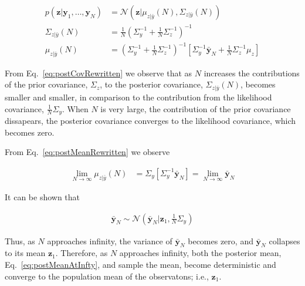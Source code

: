 \documentclass[12pt]{article}
\begin{document}
\begin{align}
    p(\mathbf{z}|\mathbf{y}_1,\ldots,\mathbf{y}_N)&=\mathcal{N}(\mathbf{z}|\mu_{z|\bar{y}}(N),\Sigma_{z|\bar{y}}(N))\nonumber\\
    \Sigma_{z|\bar{y}}(N)&=\frac{1}{N}\left(\Sigma_y^{-1}+\frac{1}{N}\Sigma_z^{-1}\right)^{-1}\label{eq:postCovRewritten}\\
    \mu_{z|\bar{y}}(N)&=\left(\Sigma_y^{-1}+\frac{1}{N}\Sigma_z^{-1}\right)^{-1}\left[\Sigma_y^{-1}\bar{\mathbf{y}}_N+\frac{1}{N}\Sigma_z^{-1}\mu_z\right]\label{eq:postMeanRewritten}
\end{align}

From Eq.~\ref{eq:postCovRewritten} we observe that as $N$ increases the
contributions of the prior covariance, $\Sigma_z$, to the posterior covariance,
$\Sigma_{z|\bar{y}}(N)$, becomes smaller and smaller, in comparison to the
contribution from the likelihood covariance, $\frac{1}{N}\Sigma_y$. When $N$ is
very large, the contribution of the prior covariance dissapears, the posterior
covariance converges to the likelihood covariance, which becomes zero.

From Eq.~\ref{eq:postMeanRewritten} we observe 

\begin{align}
    \lim_{N\rightarrow\infty}\mu_{z|\bar{y}}(N)&=\Sigma_y\left[\Sigma_y^{-1}\bar{\mathbf{y}}_N\right]=\lim_{N\rightarrow\infty}\bar{\mathbf{y}}_N\label{eq:postMeanAtInfty}
\end{align}

It can be shown that 

\begin{align}
    \bar{\mathbf{y}}_N\sim\mathcal{N}(\bar{\mathbf{y}}_N|\mathbf{z}_1,\frac{1}{N}\Sigma_y)\nonumber
\end{align}

\noindent Thus, as $N$ approaches infinity, the variance of $\bar{\mathbf{y}}_N$
becomes zero, and $\bar{\mathbf{y}}_N$ collapses to its mean $\mathbf{z}_1$.
Therefore, as $N$ approaches infinity, both the posterior mean,
Eq.~\ref{eq:postMeanAtInfty}, and sample the mean, become deterministic and
converge to the population mean of the observatons; i.e., $\mathbf{z}_1$.



\end{document}
